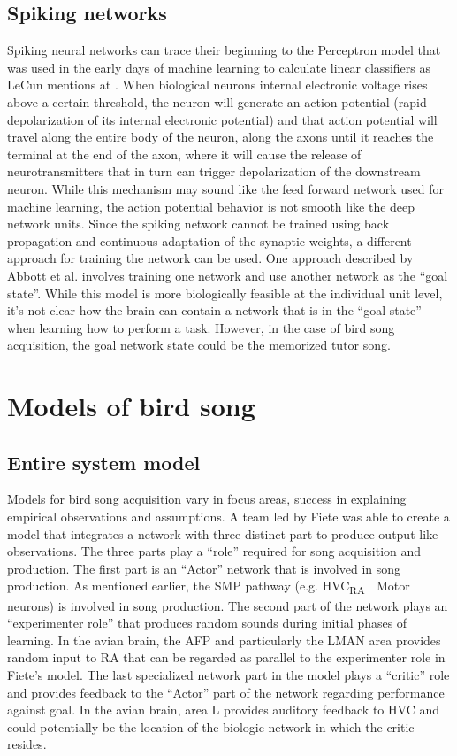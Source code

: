 \documentclass[draft,12pt,oneside]{CUNY_PhD}
\begin{document}
\section{Spiking networks}
Spiking neural networks can trace their beginning to the Perceptron model that was used in the early days of machine learning to calculate linear classifiers as LeCun mentions at \cite{13}. When biological neurons internal electronic voltage rises above a certain threshold, the neuron will generate an action potential (rapid depolarization of its internal electronic potential) and that action potential will travel along the entire body of the neuron, along the axons until it reaches the terminal at the end of the axon, where it will cause the release of neurotransmitters that in turn can trigger depolarization of the downstream neuron. While this mechanism may sound like the feed forward network used for machine learning, the action potential behavior is not smooth like the deep network units. Since the spiking network cannot be trained using back propagation and continuous adaptation of the synaptic weights, a different approach for training the network can be used. One approach described by Abbott et al. \cite{8} involves training one network and use another network as the “goal state”. While this model is more biologically feasible at the individual unit level, it’s not clear how the brain can contain a network that is in the “goal state” when learning how to perform a task. However, in the case of bird song acquisition, the goal network state could be the memorized tutor song.

\chapter{Models of bird song}
\section{Entire system model}
Models for bird song acquisition vary in focus areas, success in explaining empirical observations and assumptions. A team led by Fiete \cite{2} was able to create a model that integrates a network with three distinct part to produce output like observations. The three parts play a “role” required for song acquisition and production. The first part is an “Actor” network that is involved in song production. As mentioned earlier, the SMP pathway (e.g. HVC\textsubscript{RA}  Motor neurons) is involved in song production. The second part of the network plays an “experimenter role” that produces random sounds during initial phases of learning. In the avian brain, the AFP and particularly the LMAN area provides random input to RA that can be regarded as parallel to the experimenter role in Fiete’s model. The last specialized network part in the model plays a “critic” role and provides feedback to the “Actor” part of the network regarding performance against goal. In the avian brain, area L provides auditory feedback to HVC and could potentially be the location of the biologic network in which the critic resides.
\end{document}
